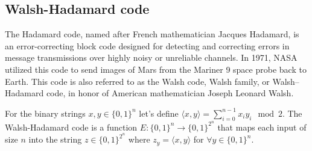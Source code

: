\documentclass[../lecture-notes.tex]{subfiles}
\begin{document}
\subsection{Walsh-Hadamard code}
The Hadamard code, named after French mathematician Jacques Hadamard, is an error-correcting block code designed for 
detecting and correcting errors in message transmissions over highly noisy or unreliable channels. In 1971, NASA 
utilized this code to send images of Mars from the Mariner 9 space probe back to Earth. This code is also referred to 
as the Walsh code, Walsh family, or Walsh–Hadamard code, in honor of American mathematician Joseph Leonard Walsh.

\begin{definition}
For the binary strings $x, y \in \{0, 1\}^n$ let's define $\langle x, y \rangle = \sum_{i = 0}^{n-1} x_iy_i\mod 2$. 
The Walsh-Hadamard code is a function $E: \{0, 1\}^n \rightarrow \{0, 1\}^{2^n}$ that maps each input of size $n$ into 
the string $z \in \{0, 1\}^{2^n}$ where $z_y = \langle x, y \rangle$ for $\forall y \in \{0, 1\}^n$.
\end{definition}
\end{document}
